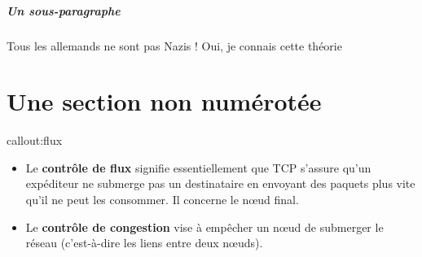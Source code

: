 \subparagraph{Un sous-paragraphe}

\begin{dialogue}
      Tous les allemands ne sont pas Nazis !
     Oui, je connais cette théorie
\end{dialogue}

\section*{Une section non numérotée}

\begin{callout}{callout:flux}
    \begin{itemize}
        \item Le \textbf{contrôle de flux} signifie essentiellement que TCP s'assure qu'un expéditeur ne submerge pas un destinataire en envoyant des paquets plus vite qu'il ne peut les consommer. Il concerne le nœud final.
        \item Le \textbf{contrôle de congestion} vise à empêcher un nœud de submerger le réseau (c'est-à-dire les liens entre deux nœuds).
    \end{itemize}
\end{callout}
